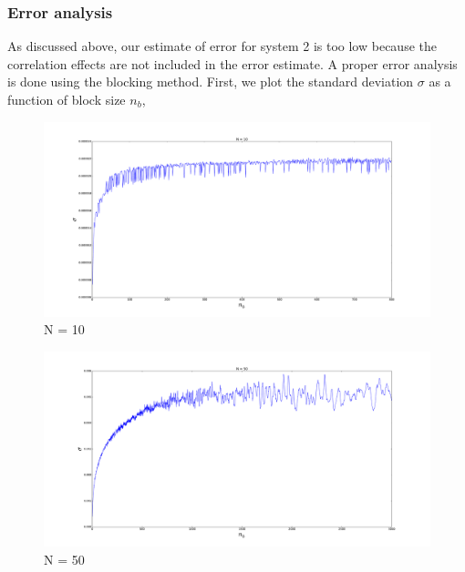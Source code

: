 \documentclass[english, a4paper]{article}
\begin{document}
\subsubsection{Error analysis}
As discussed above, our estimate of error for system 2 is too low because the correlation effects 
are not included in the error estimate. A proper error analysis is done using the blocking method.
First, we plot the standard deviation $\sigma$ as a function of block size $n_b$,
\begin{figure}[H]
\begin{center}
  \includegraphics[width = 160mm]{error_10.pdf}
  \caption{N = 10}\label{fig:error10}
  \end{center}
\end{figure}

\begin{figure}[H]
\begin{center}
  \includegraphics[width = 160mm]{error_50.pdf}
  \caption{N = 50}\label{fig:error50}
  \end{center}
\end{figure}
\end{document}
